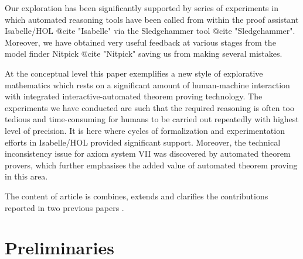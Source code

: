 Our exploration has been significantly supported by series of experiments in which automated reasoning tools 
have been called from within the proof assistant Isabelle/HOL @{cite "Isabelle"} via the Sledgehammer 
tool @{cite "Sledgehammer"}. Moreover, we have obtained very useful feedback at various stages 
from the model finder Nitpick @{cite "Nitpick"} saving us from making several mistakes.

At the conceptual level this paper exemplifies a new style of explorative mathematics which rests 
on a significant amount of human-machine interaction with integrated interactive-auto\-ma\-ted 
theorem proving technology. The experiments we have conducted are such that the required 
reasoning is often too tedious and time-consuming for humans to be carried out repeatedly with 
highest level of precision. It is here where cycles of formalization and experimentation efforts in 
Isabelle/HOL provided  significant support. Moreover, the technical inconsistency issue for
axiom system VII was discovered by automated theorem provers, which further emphasises the added 
value of automated theorem proving in this area. 

The content of article is combines, extends and clarifies the
contributions reported in two previous papers \cite{ICMS,ArXiv}.




\section{Preliminaries}
\label{sec:preliminaries}
